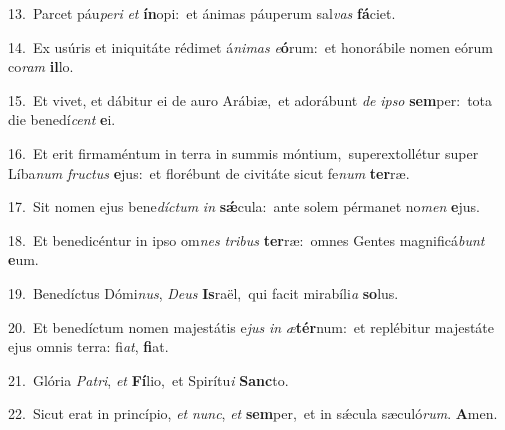 {\numbfont\textcolor{\numbcolor}{13.}}~Parcet páu\-\textit{pe}\-\textit{ri} \textit{et} \textbf{ín}\-opi:~\star et ánimas páuperum sal\textit{vas} \textbf{fá}\-ciet.\par
{\numbfont\textcolor{\numbcolor}{14.}}~Ex usúris et iniquitáte rédimet á\-\textit{ni}\-\textit{mas} \textit{e}\-\textbf{ó}rum:~\star et honorábile nomen eórum co\textit{ram} \textbf{il}\-lo.\par
{\numbfont\textcolor{\numbcolor}{15.}}~Et vivet, et dábitur ei de auro Arábiæ,~\dagger et adorábunt \textit{de} \textit{ip}\-\textit{so} \textbf{sem}\-per:~\star tota die benedí\textit{cent} \textbf{e}\-i.\par
{\numbfont\textcolor{\numbcolor}{16.}}~Et erit firmaméntum in terra in summis móntium,~\dagger superextollétur super Líba\textit{num} \textit{fruc}\-\textit{tus} \textbf{e}\-jus:~\star et florébunt de civitáte sicut fe\textit{num} \textbf{ter}\-ræ.\par
{\numbfont\textcolor{\numbcolor}{17.}}~Sit nomen ejus bene\-\textit{díc}\-\textit{tum} \textit{in} \textbf{sǽ}\-cula:~\star ante solem pérmanet no\textit{men} \textbf{e}\-jus.\par
{\numbfont\textcolor{\numbcolor}{18.}}~Et benedicéntur in ipso om\textit{nes} \textit{tri}\-\textit{bus} \textbf{ter}\-ræ:~\star omnes Gentes magnificá\textit{bunt} \textbf{e}\-um.\par
{\numbfont\textcolor{\numbcolor}{19.}}~Benedíctus Dómi\-\textit{nus}\-, \textit{De}\-\textit{us} \textbf{Is}\-raël,~\star qui facit mirabíli\textit{a} \textbf{so}\-lus.\par
{\numbfont\textcolor{\numbcolor}{20.}}~Et benedíctum nomen majestátis e\textit{jus} \textit{in} \textit{æ}\-\textbf{tér}num:~\star et replébitur majestáte ejus omnis terra: fi\-\textit{at}\-, \textbf{fi}\-at.\par
{\numbfont\textcolor{\numbcolor}{21.}}~Glória \textit{Pa}\-\textit{tri}, \textit{et} \textbf{Fí}\-lio,~\star et Spirítu\textit{i} \textbf{Sanc}\-to.\par
{\numbfont\textcolor{\numbcolor}{22.}}~Sicut erat in princípio, \textit{et} \textit{nunc}\-, \textit{et} \textbf{sem}\-per,~\star et in sǽcula sæculó\-\textit{rum}\-. \textbf{A}\-men.\par
